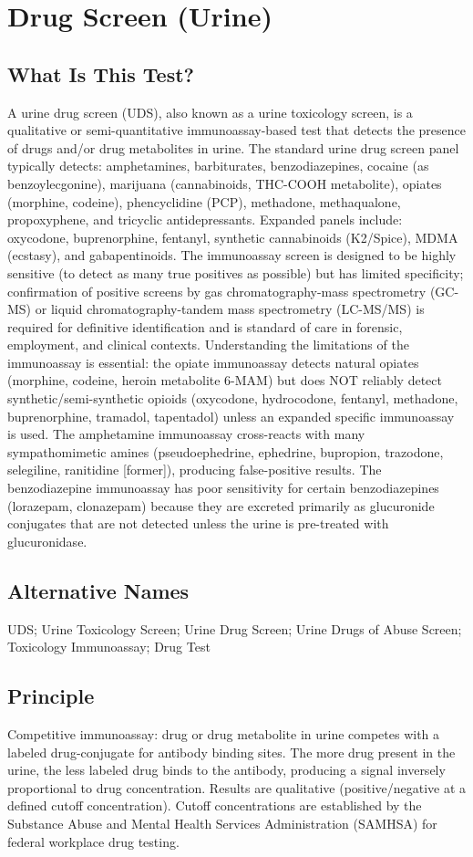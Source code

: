 \chapter{Drug Screen (Urine)}
\section*{What Is This Test?}
A urine drug screen (UDS), also known as a urine toxicology screen, is a qualitative or semi-quantitative immunoassay-based test that detects the presence of drugs and/or drug metabolites in urine. The standard urine drug screen panel typically detects: amphetamines, barbiturates, benzodiazepines, cocaine (as benzoylecgonine), marijuana (cannabinoids, THC-COOH metabolite), opiates (morphine, codeine), phencyclidine (PCP), methadone, methaqualone, propoxyphene, and tricyclic antidepressants. Expanded panels include: oxycodone, buprenorphine, fentanyl, synthetic cannabinoids (K2/Spice), MDMA (ecstasy), and gabapentinoids. The immunoassay screen is designed to be highly sensitive (to detect as many true positives as possible) but has limited specificity; confirmation of positive screens by gas chromatography-mass spectrometry (GC-MS) or liquid chromatography-tandem mass spectrometry (LC-MS/MS) is required for definitive identification and is standard of care in forensic, employment, and clinical contexts. Understanding the limitations of the immunoassay is essential: the opiate immunoassay detects natural opiates (morphine, codeine, heroin metabolite 6-MAM) but does NOT reliably detect synthetic/semi-synthetic opioids (oxycodone, hydrocodone, fentanyl, methadone, buprenorphine, tramadol, tapentadol) unless an expanded specific immunoassay is used. The amphetamine immunoassay cross-reacts with many sympathomimetic amines (pseudoephedrine, ephedrine, bupropion, trazodone, selegiline, ranitidine [former]), producing false-positive results. The benzodiazepine immunoassay has poor sensitivity for certain benzodiazepines (lorazepam, clonazepam) because they are excreted primarily as glucuronide conjugates that are not detected unless the urine is pre-treated with glucuronidase.
\section*{Alternative Names}
UDS; Urine Toxicology Screen; Urine Drug Screen; Urine Drugs of Abuse Screen; Toxicology Immunoassay; Drug Test
\section*{Principle}
Competitive immunoassay: drug or drug metabolite in urine competes with a labeled drug-conjugate for antibody binding sites. The more drug present in the urine, the less labeled drug binds to the antibody, producing a signal inversely proportional to drug concentration. Results are qualitative (positive/negative at a defined cutoff concentration). Cutoff concentrations are established by the Substance Abuse and Mental Health Services Administration (SAMHSA) for federal workplace drug testing.
